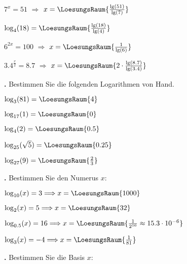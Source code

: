 \begin{bbwAufgabenBlock}
\item $7^x = 51$   $\Longrightarrow$ $x=\LoesungsRaum{ \frac{\lg(51)}{\lg(7)}}$
\item $\log_4(18) = \LoesungsRaum{\frac{\lg(18)}{\lg(4)}}$
\item $6^{2x} = 100$   $\Longrightarrow$ $x=\LoesungsRaum{ \frac1{\lg(6)}}$
\item $3.4^{\frac{x}{2}} = 8.7$   $\Longrightarrow$ $x=\LoesungsRaum{ 2\cdot{} \frac{\lg(8.7)}{\lg(3.4)} }$

\end{bbwAufgabenBlock}



\newpage

\textbf{\bbwAufgabenNummer{}.}
Bestimmen Sie die folgenden Logarithmen von Hand.

\begin{bbwAufgabenBlock}
\item $\log_3(81)     =    \LoesungsRaum{4}$
\item $\log_{17}(1)     =    \LoesungsRaum{0}$
\item $\log_4(2)     =    \LoesungsRaum{0.5}$
\item $\log_{25}(\sqrt{5})     =    \LoesungsRaum{0.25}$
\item $\log_{27}(9)     =    \LoesungsRaum{\frac23}$
\end{bbwAufgabenBlock}

\newpage

\textbf{\bbwAufgabenNummer{}.}
Bestimmen Sie den Numerus $x$:

\begin{bbwAufgabenBlock}
\item $\log_{10}(x)  =  3 \Longrightarrow x =    \LoesungsRaum{1000}$
\item $\log_{2}(x)   =  5 \Longrightarrow x =    \LoesungsRaum{32}$
\item $\log_{0.5}(x) = 16 \Longrightarrow x =    \LoesungsRaum{\frac1{2^{16}}\approx 15.3\cdot{}10^{-6}}$
\item $\log_{3}(x)   = -4 \Longrightarrow x =    \LoesungsRaum{\frac1{81}}$
\end{bbwAufgabenBlock}

\newpage

\textbf{\bbwAufgabenNummer{}.}
Bestimmen Sie die Basis $x$:

